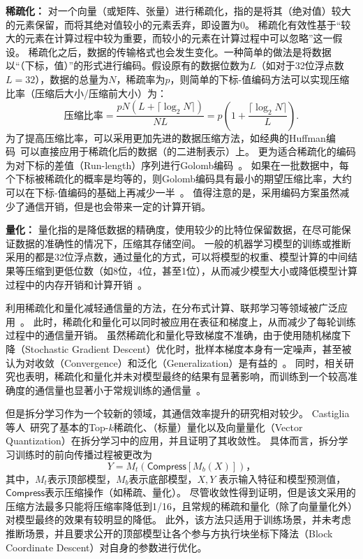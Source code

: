 \textbf{稀疏化：}
对一个向量（或矩阵、张量）进行稀疏化，指的是将其（绝对值）较大的元素保留，而将其绝对值较小的元素丢弃，即设置为0。
%
稀疏化有效性基于“较大的元素在计算过程中较为重要，而较小的元素在计算过程中可以忽略”这一假设。
%
稀疏化之后，数据的传输格式也会发生变化。一种简单的做法是将数据以“（下标，值）”的形式进行编码。假设原有的数据位数为$L$（如对于32位浮点数$L=32$），数据的总量为$N$，稀疏率为$p$，则简单的下标-值编码方法可以实现压缩比率（压缩后大小/压缩前大小）为：
\begin{equation}
    \text{压缩比率}=\dfrac{pN(L + \lceil \log_2N \rceil)}{NL} = p(1 + \dfrac{\lceil \log_2N \rceil}{L}).
\end{equation}
为了提高压缩比率，可以采用更加先进的数据压缩方法，如经典的Huffman编码~\cite{huffman1952}可以直接应用于稀疏化后的数据（的二进制表示）上。
%
更为适合稀疏化的编码为对下标的差值（Run-length）序列进行Golomb编码~\cite{gallager1975golomb}。
%
如果在一批数据中，每个下标被稀疏化的概率是均等的，则Golomb编码具有最小的期望压缩比率，大约可以在下标-值编码的基础上再减少一半~\cite{sattler2019sparse_binary}。
%
值得注意的是，采用编码方案虽然减少了通信开销，但是也会带来一定的计算开销。


\textbf{量化：}
量化指的是降低数据的精确度，使用较少的比特位保留数据，在尽可能保证数据的准确性的情况下，压缩其存储空间。
%
一般的机器学习模型的训练或推断采用的都是32位浮点数，通过量化的方式，可以将模型的权重、模型计算的中间结果等压缩到更低位数（如8位，4位，甚至1位），从而减少模型大小或降低模型计算过程中的内存开销和计算开销~\cite{zhou2016dorefa,banner2018_8bit,yang2019quantization}。




利用稀疏化和量化减轻通信量的方法，在分布式计算、联邦学习等领域被广泛应用~\cite{wen2017terngrad,sattler2019sparse_binary}。
%
此时，稀疏化和量化可以同时被应用在表征和梯度上，从而减少了每轮训练过程中的通信量开销。
%
虽然稀疏化和量化导致梯度不准确，由于使用随机梯度下降（Stochastic Gradient Descent）优化时，批样本梯度本身有一定噪声，甚至被认为对收敛（Convergence）和泛化（Generalization）是有益的~\cite{hardt2016sgd,goyal2017sgd_imagenet,chaudhari2018sgd}。
%
同时，相关研究也表明，稀疏化和量化并未对模型最终的结果有显著影响，而训练到一个较高准确度的通信量也显著小于常规训练的通信量~\cite{aji2017sparse,sattler2019sparse_binary,wen2017terngrad}。

%
但是拆分学习作为一个较新的领域，其通信效率提升的研究相对较少。
%
Castiglia等人~\cite{castiglia2022compressed_vfl}研究了基本的Top-$k$稀疏化、（标量）量化以及向量量化（Vector Quantization）在拆分学习中的应用，并且证明了其收敛性。
%
具体而言，拆分学习训练时的前向传播过程被更改为
\begin{equation}
\label{eq:split-compress}
    Y = M_t(\mathsf{Compress}[M_b(X)])，
\end{equation}
%
其中，$M_t$表示顶部模型，$M_b$表示底部模型，$X, Y$ 表示输入特征和模型预测值，$\mathsf{Compress}$表示压缩操作（如稀疏、量化）。
%
尽管收敛性得到证明，但是该文采用的压缩方法最多只能将压缩率降低到1/16，且常规的稀疏和量化（除了向量量化外）对模型最终的效果有较明显的降低。
%
此外，该方法只适用于训练场景，并未考虑推断场景，并且要求公开的顶部模型让各个参与方执行块坐标下降法（Block Coordinate Descent）对自身的参数进行优化。

